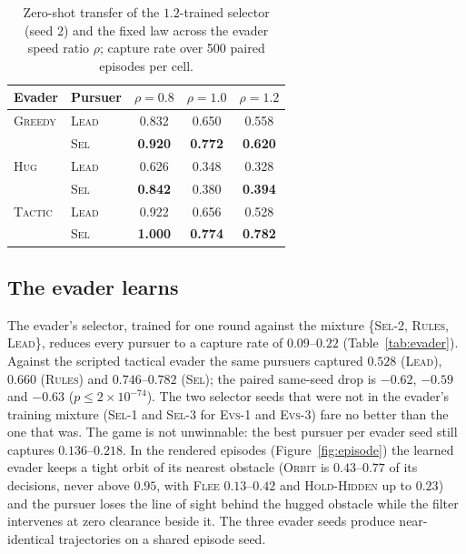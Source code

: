 \documentclass[conference]{IEEEtran}
\newcommand{\pol}[1]{\textsc{#1}}
\begin{document}
\begin{table}[t]
\caption{Zero-shot transfer of the $1.2$-trained selector (seed 2) and the fixed law across the evader speed ratio $\rho$; capture rate over 500 paired episodes per cell.}
\label{tab:ratio}
\centering
\small
\begin{tabular}{llccc}
\toprule
Evader & Pursuer & $\rho=0.8$ & $\rho=1.0$ & $\rho=1.2$ \\
\midrule
\pol{Greedy} & \pol{Lead} & 0.832 & 0.650 & 0.558 \\
             & \pol{Sel}  & \textbf{0.920} & \textbf{0.772} & \textbf{0.620} \\
\pol{Hug}    & \pol{Lead} & 0.626 & 0.348 & 0.328 \\
             & \pol{Sel}  & \textbf{0.842} & 0.380 & \textbf{0.394} \\
\pol{Tactic} & \pol{Lead} & 0.922 & 0.656 & 0.528 \\
             & \pol{Sel}  & \textbf{1.000} & \textbf{0.774} & \textbf{0.782} \\
\bottomrule
\end{tabular}
\end{table}

\subsection{The evader learns}
\label{sec:res-evader}
The evader's selector, trained for one round against the mixture \{\pol{Sel}-2, \pol{Rules}, \pol{Lead}\}, reduces every pursuer to a capture rate of $0.09$--$0.22$ (Table~\ref{tab:evader}). Against the scripted tactical evader the same pursuers captured $0.528$ (\pol{Lead}), $0.660$ (\pol{Rules}) and $0.746$--$0.782$ (\pol{Sel}); the paired same-seed drop is $-0.62$, $-0.59$ and $-0.63$ ($p\le2\times10^{-74}$). The two selector seeds that were not in the evader's training mixture (\pol{Sel}-1 and \pol{Sel}-3 for \pol{Evs}-1 and \pol{Evs}-3) fare no better than the one that was. The game is not unwinnable: the best pursuer per evader seed still captures $0.136$--$0.218$. In the rendered episodes (Figure~\ref{fig:episode}) the learned evader keeps a tight orbit of its nearest obstacle (\pol{Orbit} is $0.43$--$0.77$ of its decisions, never above $0.95$, with \pol{Flee} $0.13$--$0.42$ and \pol{Hold-Hidden} up to $0.23$) and the pursuer loses the line of sight behind the hugged obstacle while the filter intervenes at zero clearance beside it. The three evader seeds produce near-identical trajectories on a shared episode seed.
\end{document}
